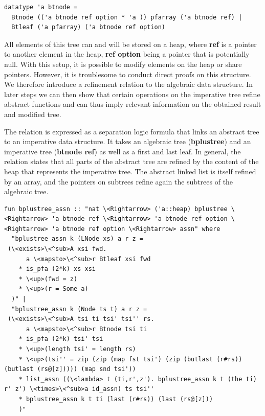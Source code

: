 \documentclass[a4paper,UKenglish,cleveref, autoref, thm-restate]{lipics-v2021}
\begin{document}
\begin{lstlisting}[mathescape=true, language=Isabelle,label=lst:btree-imp-def]
datatype 'a btnode =
  Btnode (('a btnode ref option * 'a )) pfarray ('a btnode ref) |
  Btleaf ('a pfarray) ('a btnode ref option)
\end{lstlisting}

All elements of this tree can and will be stored on a heap, where \textbf{ref} is a pointer
to another element in the heap, \textbf{ref option} being a pointer that is potentially null.
With this setup, it is possible to modify elements on the heap or share pointers.
However, it is troublesome to conduct direct proofs on this structure.
We therefore introduce a refinement relation to the algebraic data structure.
In later steps we can then show that certain operations on the imperative
tree refine abstract functions and can thus imply relevant information on the obtained result and modified tree.

The relation is expressed as a separation logic formula that links an abstract tree to an
imperative data structure.
It takes an algebraic tree (\textbf{bplustree}) and an imperative tree
(\textbf{btnode ref}) as well as a first and last leaf.
In general, the relation states that all parts of the abstract tree
are refined by the content of the heap that represents the imperative tree.
The abstract linked list is itself refined by an array,
and the pointers on subtrees refine again the subtrees of the algebraic tree.

\begin{lstlisting}[mathescape=true, language=Isabelle,label=lst:btree-relation]
fun bplustree_assn :: "nat \<Rightarrow> ('a::heap) bplustree \<Rightarrow> 'a btnode ref \<Rightarrow> 'a btnode ref option \<Rightarrow> 'a btnode ref option \<Rightarrow> assn" where
  "bplustree_assn k (LNode xs) a r z =
 (\<exists>\<^sub>A xsi fwd.
      a \<mapsto>\<^sub>r Btleaf xsi fwd
    * is_pfa (2*k) xs xsi
    * \<up>(fwd = z)
    * \<up>(r = Some a)
  )" |
  "bplustree_assn k (Node ts t) a r z =
 (\<exists>\<^sub>A tsi ti tsi' tsi'' rs.
      a \<mapsto>\<^sub>r Btnode tsi ti
    * is_pfa (2*k) tsi' tsi
    * \<up>(length tsi' = length rs)
    * \<up>(tsi'' = zip (zip (map fst tsi') (zip (butlast (r#rs)) (butlast (rs@[z])))) (map snd tsi'))
    * list_assn ((\<lambda> t (ti,r',z'). bplustree_assn k t (the ti) r' z') \<times>\<^sub>a id_assn) ts tsi''
    * bplustree_assn k t ti (last (r#rs)) (last (rs@[z]))
    )"
\end{lstlisting}
\end{document}
